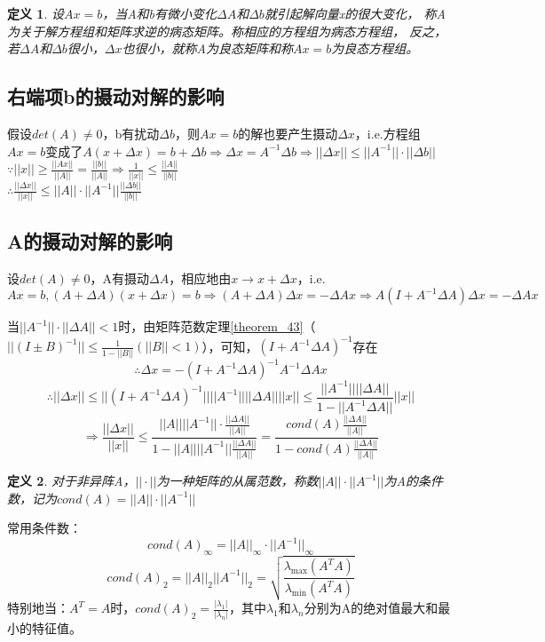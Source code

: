 \documentclass[a4paper]{article}
\newtheorem{definition}{定义}[section]
\begin{document}
\begin{definition}
  设$Ax=b$，当A和b有微小变化$\Delta A$和$\Delta b$就引起解向量x的很大变化，
  称A为关于解方程组和矩阵求逆的病态矩阵。称相应的方程组为病态方程组，
  反之，若$\Delta A$和$\Delta b$很小，$\Delta x$也很小，就称A为良态矩阵和称$Ax=b$为良态方程组。
\end{definition}

\subsection{右端项b的摄动对解的影响}
假设$det(A)\neq 0$，b有扰动$\Delta b$，则$Ax=b$的解也要产生摄动$\Delta x$，i.e.方程组$Ax=b$变成了$A(x+\Delta x)=b+\Delta b\Rightarrow 
\Delta x =A^{-1}\Delta b \Rightarrow ||\Delta x||\le ||A^{-1}||\cdot||\Delta b|| $ \\
$\because ||x||\ge \frac{||Ax||}{||A||}=\frac{||b||}{||A||}\Rightarrow \frac{1}{||x||}\le \frac{||A||}{||b||}$ \\
$\therefore \frac{||\Delta x||}{||x||} \le ||A||\cdot||A^{-1}||\frac{||\Delta b||}{||b||}$

\subsection{A的摄动对解的影响}
设$det(A)\neq 0$，A有摄动$\Delta A$，相应地由$x\rightarrow x+\Delta x$，i.e. 
$Ax=b, (A+\Delta A)(x+\Delta x)=b\Rightarrow (A+\Delta A)\Delta x = -\Delta Ax\Rightarrow A(I+A^{-1}\Delta A)\Delta x = -\Delta Ax$

当$||A^{-1}||\cdot||\Delta A||<1$时，由矩阵范数定理\ref{theorem_43}（$||(I\pm B)^{-1}||\le \frac{1}{1-||B||} (||B||<1)$），可知，$(I+A^{-1}\Delta A)^{-1}$存在
$$\therefore \Delta x = -(I+A^{-1}\Delta A)^{-1}A^{-1}\Delta Ax $$
$$\therefore ||\Delta x||\le ||(I+A^{-1}\Delta A)^{-1}||||A^{-1}||||\Delta A||||x||\le \frac{||A^{-1}||||\Delta A||}{1-||A^{-1}\Delta A||}||x|| $$
$$\Rightarrow \frac{||\Delta x||}{||x||} \le \frac{||A||||A^{-1}||\cdot\frac{||\Delta A||}{||A||}}{1-||A||||A^{-1}||\frac{||\Delta A||}{||A||}} = \frac{cond(A)\frac{||\Delta A||}{||A||}}{1-cond(A)\frac{||\Delta A||}{||A||}}$$

\begin{definition}
  对于非异阵A，$||\cdot||$为一种矩阵的从属范数，称数$||A||\cdot||A^{-1}||$为A的条件数，记为$cond(A)=||A||\cdot||A^{-1}||$
\end{definition}

常用条件数：
$$cond(A)_\infty =||A||_\infty\cdot||A^{-1}||_\infty $$
$$cond(A)_2 = ||A||_2||A^{-1}||_2=\sqrt{\frac{\lambda_{\max}(A^TA)}{\lambda_{\min}(A^TA)}}$$
特别地当：$A^T=A$时，$cond(A)_2=\frac{|\lambda_1|}{|\lambda_n|}$，其中$\lambda_1$和$\lambda_n$分别为A的绝对值最大和最小的特征值。
\end{document}
